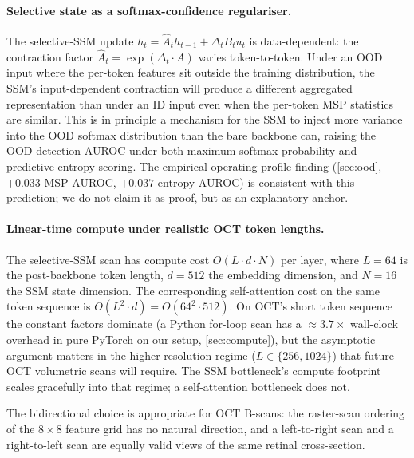 \documentclass[5p]{elsarticle}
\begin{document}
\paragraph{Selective state as a softmax-confidence regulariser.} The selective-SSM update $h_t = \hat{A}_t h_{t-1} + \Delta_t B_t u_t$ is data-dependent: the contraction factor $\hat{A}_t = \exp(\Delta_t \cdot A)$ varies token-to-token. Under an OOD input where the per-token features sit outside the training distribution, the SSM's input-dependent contraction will produce a different aggregated representation than under an ID input even when the per-token MSP statistics are similar. This is in principle a mechanism for the SSM to inject more variance into the OOD softmax distribution than the bare backbone can, raising the OOD-detection AUROC under both maximum-softmax-probability and predictive-entropy scoring. The empirical operating-profile finding (\cref{sec:ood}, $+0.033$ MSP-AUROC, $+0.037$ entropy-AUROC) is consistent with this prediction; we do not claim it as proof, but as an explanatory anchor.

\paragraph{Linear-time compute under realistic OCT token lengths.} The selective-SSM scan has compute cost $O(L \cdot d \cdot N)$ per layer, where $L=64$ is the post-backbone token length, $d=512$ the embedding dimension, and $N=16$ the SSM state dimension. The corresponding self-attention cost on the same token sequence is $O(L^2 \cdot d) = O(64^2 \cdot 512)$. On OCT's short token sequence the constant factors dominate (a Python for-loop scan has a $\approx 3.7\times$ wall-clock overhead in pure PyTorch on our setup, \cref{sec:compute}), but the asymptotic argument matters in the higher-resolution regime ($L \in \{256, 1024\}$) that future OCT volumetric scans will require. The SSM bottleneck's compute footprint scales gracefully into that regime; a self-attention bottleneck does not.

The bidirectional choice is appropriate for OCT B-scans: the raster-scan ordering of the $8\times 8$ feature grid has no natural direction, and a left-to-right scan and a right-to-left scan are equally valid views of the same retinal cross-section.
\end{document}
